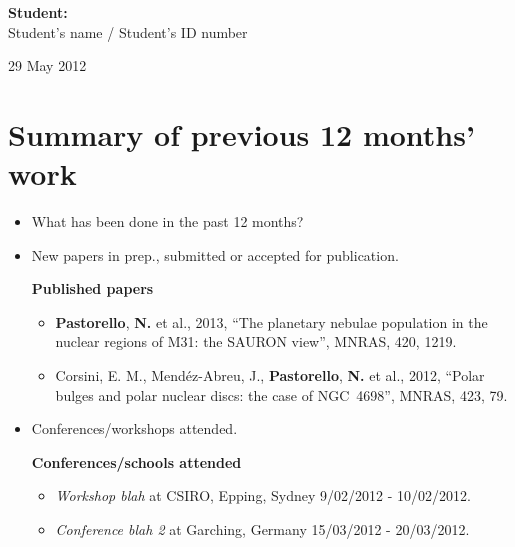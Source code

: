 \documentclass[useAMS,usenatbib,onecolumn]{mnras}
\begin{document}
\begin{flushright}
{\bf Student:}\\
Student's name / Student's ID number
\end{flushright}\hspace{8cm}


\begin{center}
29 May 2012
\end{center}
\newpage

\date{Date of the review}

\section{Summary of previous 12 months' work}
\label{sec:summary}

\begin{itemize}
  \item{What has been done in the past 12 months?}
  \item{New papers in prep., submitted or accepted for publication.\\}

  \textbf{Published papers}
  \begin{itemize}
      \item{\textbf{Pastorello}, \textbf{N.} et al., 2013}, ``The planetary nebulae population in the nuclear regions of M31: the SAURON view'', MNRAS, 420, 1219.
      \item{Corsini, E. M., Mend\'ez-Abreu, J., \textbf{Pastorello}, \textbf{N.} et al., 2012}, ``Polar bulges and polar nuclear discs: the case of NGC~4698'', MNRAS, 423, 79.
  \end{itemize}

  \item{Conferences/workshops attended.\\}

  \textbf{Conferences/schools attended}
  \begin{itemize}
      \item{\textit{Workshop blah}} at CSIRO, Epping, Sydney 9/02/2012 - 10/02/2012.
      \item{\textit{Conference blah 2}} at Garching, Germany 15/03/2012 - 20/03/2012.
  \end{itemize}

\end{itemize}
\end{document}
